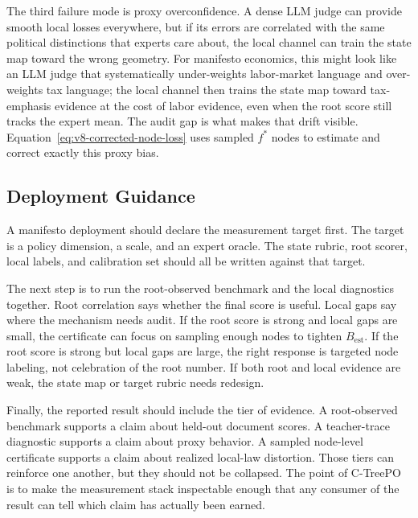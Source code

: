 The third failure mode is proxy overconfidence. A dense LLM judge can
provide smooth local losses everywhere, but if its errors are
correlated with the same political distinctions that experts care
about, the local channel can train the state map toward the wrong
geometry. For manifesto economics, this might look like an LLM judge
that systematically under-weights labor-market language and
over-weights tax language; the local channel then trains the state
map toward tax-emphasis evidence at the cost of labor evidence, even
when the root score still tracks the expert mean. The audit gap is
what makes that drift visible. Equation~\eqref{eq:v8-corrected-node-loss}
uses sampled \(f^\ast\) nodes to estimate and correct exactly this
proxy bias.

\subsection{Deployment Guidance}

A manifesto deployment should declare the measurement target first.
The target is a policy dimension, a scale, and an expert oracle. The
state rubric, root scorer, local labels, and calibration set should
all be written against that target.

The next step is to run the root-observed benchmark and the local diagnostics
together. Root correlation says whether the final score is useful. Local gaps
say where the mechanism needs audit. If the root score is strong and local
gaps are small, the certificate can focus on sampling enough nodes to tighten
\(B_{\mathrm{est}}\). If the root score is strong but local gaps are large,
the right response is targeted node labeling, not celebration of the root
number. If both root and local evidence are weak, the state map or target
rubric needs redesign.

Finally, the reported result should include the tier of evidence. A
root-observed benchmark supports a claim about held-out document scores. A
teacher-trace diagnostic supports a claim about proxy behavior. A sampled
node-level certificate supports a claim about realized local-law distortion.
Those tiers can reinforce one another, but they should not be
collapsed. The point of C-TreePO is to make the measurement stack
inspectable enough that any consumer of the result can tell which
claim has actually been earned.
